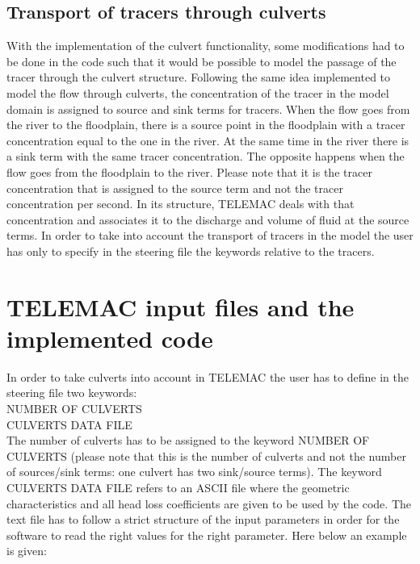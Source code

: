 \subsection{Transport of tracers through culverts}


With the implementation of the culvert functionality, 
some modifications had to be done in the code such that 
it would be possible to model the passage of the tracer through the culvert structure. 
Following the same idea implemented to model the flow through culverts, 
the concentration of the tracer in the model domain is assigned to source and sink terms 
for tracers. When the flow goes from the river to the floodplain, 
there is a source point in the floodplain with a tracer concentration equal to the one 
in the river. At the same time in the river there is a sink term with the same tracer 
concentration. The opposite happens when the flow goes from the floodplain to the river. 
Please note that it is the tracer concentration that is assigned to the source term 
and not the tracer concentration per second. 
In its structure, TELEMAC deals with that concentration and associates it to the 
discharge and volume of fluid at the source terms.
In order to take into account the transport of tracers in the model the 
user has only to specify in the steering file the keywords relative to the tracers.

\section{TELEMAC input files and the implemented code}

In order to take culverts into account in TELEMAC the user has to define in the 
steering file two keywords: \\
NUMBER OF CULVERTS \\
CULVERTS DATA FILE\\

The number of culverts has to be assigned to the keyword NUMBER OF CULVERTS
(please note that this is the number of culverts and not the number of sources/sink terms: 
one culvert has two sink/source terms). 
The keyword CULVERTS DATA FILE refers to an ASCII file where the geometric characteristics 
and all head loss coefficients are given to be used by the code. 
The text file has to follow a strict structure of the input parameters in order 
for the software to read the right values for the right parameter. 
Here below an example is given:\\


